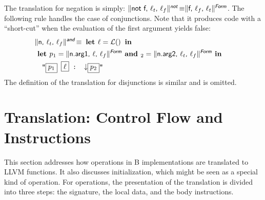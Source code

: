 \documentclass{llncs}
\newcommand{\trad}[2]{\ensuremath{\lVert \textsf{#1} \rVert^{\textit{#2}}}}
\newcommand{\nl}[0]{\ensuremath{\downarrow}}
\DeclareMathOperator{\isdef}{\equiv}
\DeclareMathOperator{\lbl}{\mathcal{L}()}
\newcommand{\llvm}[1]{\texttt{#1}}
\newcommand{\B}[1]{\textsf{#1}}
\newcommand{\LET}[0]{\textbf{ let }}
\newcommand{\IN}[0]{\textbf{ in }}
\newcommand{\AND}[1]{\textbf{ and }}
\newcommand{\PH}[1]{\framebox{$#1$}}
\begin{document}
\noindent The translation for negation is simply: $\trad{not f, $\ell_t$,
  $\ell_f$}{\B{not}} \isdef \trad{f, $\ell_f$, $\ell_t$}{\B{Form}}$.  The
following rule handles the case of conjunctions. Note that it produces code with
a ``short-cut'' when the evaluation of the first argument yields false:
\begin{align*}
\begin{split}
  \lefteqn{\trad{n, $\ell_t$, $\ell_f$}{\B{and}} \isdef \LET \ell = \lbl \IN} \\
  & \LET p_1 = \trad{n.arg1, $\ell$, $\ell_f$}{\B{Form}}
  \AND p_2 = \trad{n.arg2, $\ell_t$, $\ell_f$}{\B{Form}} \IN \\
  & \quad \llvm{"\PH{p_1} \PH{\ell} :  \nl \PH{p_2}"}
\end{split}
\end{align*}
The definition of the translation for disjunctions is similar and is omitted.

\section{Translation: Control Flow and Instructions
\label{sec:control}}

This section addresses how operations in B implementations are translated to
LLVM functions. It also discusses initialization, which might be seen as a
special kind of operation. For operations, the presentation of the translation
is divided into three steps: the signature, the local data, and the body
instructions.
\end{document}
